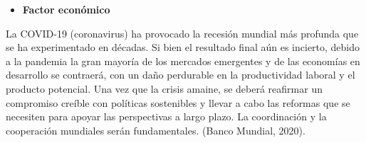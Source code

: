 \documentclass[
  stu,
  floatsintext,
  longtable,
  a4paper,
  nolmodern,
  notxfonts,
  notimes,
  12pt,
  colorlinks=true,linkcolor=blue,citecolor=blue,urlcolor=blue]{apa7}
\providecommand{\tightlist}{%
  \setlength{\itemsep}{0pt}\setlength{\parskip}{0pt}}
\begin{document}
\begin{itemize}
\tightlist
\item
  \textbf{Factor económico}
\end{itemize}

La COVID-19 (coronavirus) ha provocado la recesión mundial más profunda
que se ha experimentado en décadas. Si bien el resultado final aún es
incierto, debido a la pandemia la gran mayoría de los mercados
emergentes y de las economías en desarrollo se contraerá, con un daño
perdurable en la productividad laboral y el producto potencial. Una vez
que la crisis amaine, se deberá reafirmar un compromiso creíble con
políticas sostenibles y llevar a cabo las reformas que se necesiten para
apoyar las perspectivas a largo plazo. La coordinación y la cooperación
mundiales serán fundamentales. (Banco Mundial, 2020).
\end{document}
